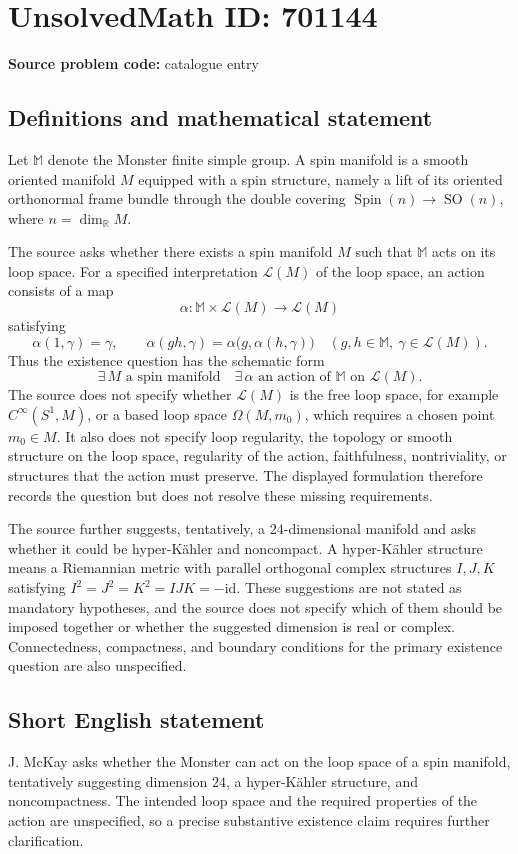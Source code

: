 \documentclass[11pt]{article}
\newcommand{\R}{\mathbb{R}}
\begin{document}
\section*{UnsolvedMath ID: 701144}
\textbf{Source problem code:} catalogue entry
\subsection{Definitions and mathematical statement}
Let \(\mathbb M\) denote the Monster finite simple group. A spin manifold is a smooth oriented manifold \(M\) equipped with a spin structure, namely a lift of its oriented orthonormal frame bundle through the double covering \(\operatorname{Spin}(n)\to\operatorname{SO}(n)\), where \(n=\dim_{\R}M\).

The source asks whether there exists a spin manifold \(M\) such that \(\mathbb M\) acts on its loop space. For a specified interpretation \(\mathcal L(M)\) of the loop space, an action consists of a map
\[
\alpha:\mathbb M\times\mathcal L(M)\longrightarrow\mathcal L(M)
\]
satisfying
\[
\alpha(1,\gamma)=\gamma,\qquad
\alpha(gh,\gamma)=\alpha\bigl(g,\alpha(h,\gamma)\bigr)
\quad(g,h\in\mathbb M,\ \gamma\in\mathcal L(M)).
\]
Thus the existence question has the schematic form
\[
\exists\, M\text{ a spin manifold}\quad
\exists\,\alpha\text{ an action of }\mathbb M\text{ on }\mathcal L(M).
\]
The source does not specify whether \(\mathcal L(M)\) is the free loop space, for example \(C^\infty(S^1,M)\), or a based loop space \(\Omega(M,m_0)\), which requires a chosen point \(m_0\in M\). It also does not specify loop regularity, the topology or smooth structure on the loop space, regularity of the action, faithfulness, nontriviality, or structures that the action must preserve. The displayed formulation therefore records the question but does not resolve these missing requirements.

The source further suggests, tentatively, a \(24\)-dimensional manifold and asks whether it could be hyper-K\"{a}hler and noncompact. A hyper-K\"{a}hler structure means a Riemannian metric with parallel orthogonal complex structures \(I,J,K\) satisfying \(I^2=J^2=K^2=IJK=-\mathrm{id}\). These suggestions are not stated as mandatory hypotheses, and the source does not specify which of them should be imposed together or whether the suggested dimension is real or complex. Connectedness, compactness, and boundary conditions for the primary existence question are also unspecified.
\subsection{Short English statement}
J. McKay asks whether the Monster can act on the loop space of a spin manifold, tentatively suggesting dimension \(24\), a hyper-K\"{a}hler structure, and noncompactness. The intended loop space and the required properties of the action are unspecified, so a precise substantive existence claim requires further clarification.
\end{document}

